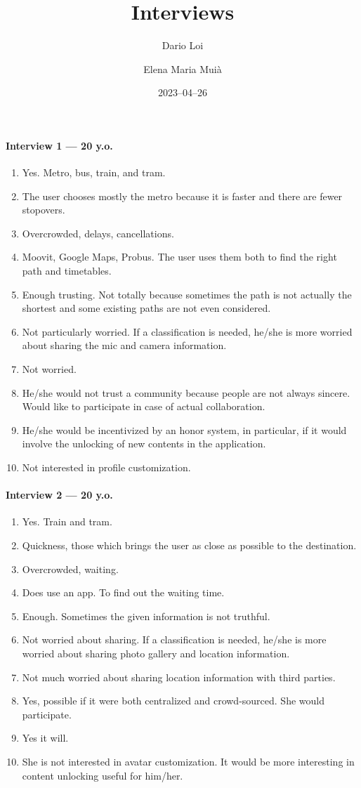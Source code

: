 \documentclass[a4paper, 11pt, twocolumn]{article}
\title{Interviews}
\author{Dario Loi \and Elena Maria Muià}
\date{2023--04--26}
\begin{document}
\maketitle
\paragraph*{Interview 1 --- 20 y.o.}
\begin{enumerate}
    \item Yes. Metro, bus, train, and tram.
    \item The user chooses mostly the metro because it is faster and there are fewer stopovers.
    \item Overcrowded, delays, cancellations.
    \item Moovit, Google Maps, Probus. The user uses them both to find the right path and timetables.
    \item Enough trusting. Not totally because sometimes the path is not actually the shortest and some existing paths are not even considered.
    \item Not particularly worried. If a classification is needed, he/she is more worried about sharing the mic and camera information.
    \item Not worried.
    \item He/she would not trust a community because people are not always sincere. Would like to participate in case of actual collaboration.
    \item He/she would be incentivized by an honor system, in particular, if it would involve the unlocking of new contents in the application.
    \item Not interested in profile customization.

\end{enumerate}

\paragraph*{Interview 2 --- 20 y.o.}
\begin{enumerate}
    \item Yes. Train and tram.
    \item Quickness, those which brings the user as close as possible to the destination.
    \item Overcrowded, waiting.
    \item Does use an app. To find out the waiting time.
    \item Enough. Sometimes the given information is not truthful.
    \item Not worried about sharing. If a classification is needed, he/she is more worried about sharing photo gallery and location information.
    \item Not much worried about sharing location information with third parties.
    \item Yes, possible if it were both centralized and crowd-sourced. She would participate.
    \item Yes it will.
    \item She is not interested in avatar customization. It would be more interesting in content unlocking useful for him/her.
\end{enumerate}
\end{document}
